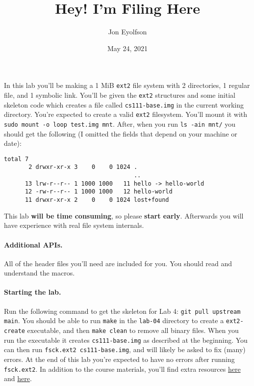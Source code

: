 

\title{Hey! I'm Filing Here}
\author{Jon Eyolfson}
\date{May 24, 2021}



\maketitle

In this lab you'll be making a 1 MiB \texttt{ext2} file system with 2
directories, 1 regular file, and 1 symbolic link.
You'll be given the \texttt{ext2} structures and some initial skeleton code
which creates a file called \texttt{cs111-base.img} in the current working
directory.
You're expected to create a valid \texttt{ext2} filesystem.
You'll mount it with \texttt{sudo mount -o loop test.img mnt}.
After, when you run \texttt{ls -ain mnt/} you should get the following
(I omitted the fields that depend on your machine or date):

\begin{lstlisting}
total 7
       2 drwxr-xr-x 3    0    0 1024 .
                                     ..
      13 lrw-r--r-- 1 1000 1000   11 hello -> hello-world
      12 -rw-r--r-- 1 1000 1000   12 hello-world
      11 drwxr-xr-x 2    0    0 1024 lost+found
\end{lstlisting}

This lab \textbf{will be time consuming}, so please \textbf{start early}.
Afterwards you will have experience with real file system internals.

\paragraph{Additional APIs.}

All of the header files you'll need are included for you.
You should read and understand the macros.

\paragraph{Starting the lab.}

Run the following command to get the skeleton for Lab 4:
\texttt{git pull upstream main}.
You should be able to run \texttt{make} in the \texttt{lab-04} directory to
create a \texttt{ext2-create} executable, and then \texttt{make clean}
to remove all binary files.
When you run the executable it creates \texttt{cs111-base.img} as described
at the beginning.
You can then run \lstinline|fsck.ext2 cs111-base.img|, and will likely be
asked to fix (many) errors.
At the end of this lab you're expected to have no errors after running
\lstinline|fsck.ext2|.
In addition to the course materials, you'll find extra resources
\href{http://www.nongnu.org/ext2-doc/ext2.html}{here} and
\href{http://www.science.smith.edu/~nhowe/262/oldlabs/ext2.html}{here}.

